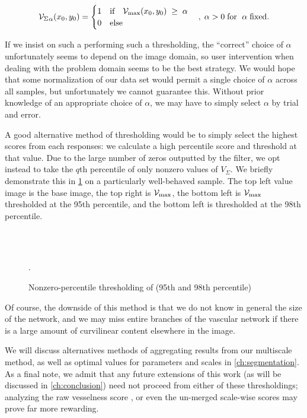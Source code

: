   \begin{equation}	    
      {\ensuremath{\mathcal{V}_{\Sigma}}}_{\alpha}(x_0,y_0) = \begin{cases}
   1 & \textrm{if}\quad \mathcal{V}_{\max}(x_0,y_0) \; \ge\;  \alpha \\
   0 & \textrm{else}
  \end{cases}
   \quad , \; \alpha > 0
   \; \textrm{for } \; \alpha \;\textrm{fixed}.
   \end{equation}
 

If we insist on such a performing such a thresholding, the ``correct'' choice of $\alpha$ unfortunately seems to depend on the image domain, so user intervention when dealing with the problem domain seems to be the best strategy. We would hope that some normalization of our data set would permit a single choice of $\alpha$ across all samples, but unfortunately we cannot guarantee this. Without prior knowledge of an appropriate choice of $\alpha$, we may have to simply select $\alpha$ by trial and error.


A good alternative method of thresholding would be to simply select the highest scores from each responses: we calculate a high percentile score and threshold at that value. Due to the large number of zeros outputted by the filter, we opt instead to take the $q$th percentile of only nonzero values of $V_\Sigma$. 
We briefly demonstrate this in \cref{fig:qthresh_demo} on a particularly well-behaved sample. The top left value image is the base image, the top right is $\mathcal{V}_{\max}$, the bottom left is $\mathcal{V}_{\max}$ thresholded at the 95th percentile, and the bottom left is thresholded at the 98th percentile.

\begin{figure} \centering
{}
 \\
 \\
\caption{Nonzero-percentile thresholding of \Vmax (95th and 98th percentile)}.
\label{fig:qthresh_demo}
\end{figure}

Of course, the downside of this method is that we do not know in general the size of the network, and  we may miss entire branches of the vascular network if there is a large amount of curvilinear content elsewhere in the image.

We will discuss alternatives methods of aggregating results from our multiscale method, as well as optimal values for parameters and scales
in \cref{ch:segmentation}. As a final note, we admit that any future extensions of this work (as will be discussed in \cref{ch:conclusion}) need not proceed from either of these thresholdings; analyzing the raw vesselness score \Vmax, or even the un-merged scale-wise scores may prove far more rewarding.

